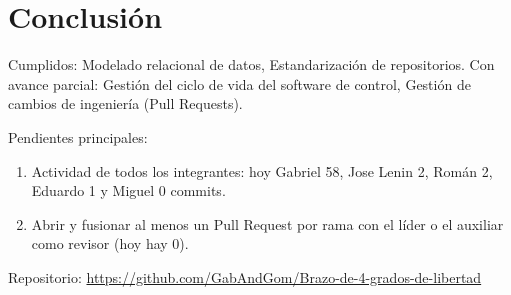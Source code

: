 \documentclass[a4paper,11pt]{article}
\begin{document}
\section{Conclusión}
Cumplidos: Modelado relacional de datos, Estandarización de repositorios. Con avance parcial: Gestión del ciclo de vida del software de control, Gestión de cambios de ingeniería (Pull Requests).
\par\smallskip Pendientes principales:
\begin{enumerate}
\item Actividad de todos los integrantes: hoy Gabriel 58, Jose Lenin 2, Román 2, Eduardo 1 y Miguel 0 commits.
\item Abrir y fusionar al menos un Pull Request por rama con el líder o el auxiliar como revisor (hoy hay 0).
\end{enumerate}
\par\smallskip\noindent Repositorio: \url{https://github.com/GabAndGom/Brazo-de-4-grados-de-libertad}
\end{document}
